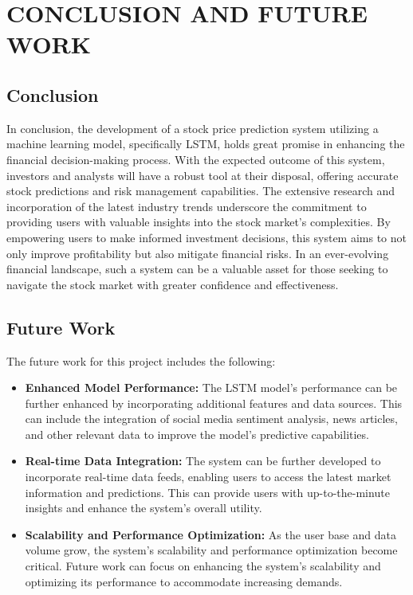 \documentclass[./main.tex]{subfiles}
\begin{document}
\chapter{CONCLUSION AND FUTURE WORK}
\section{Conclusion}
\noindent
In conclusion, the development of a stock price prediction system utilizing a machine learning model, specifically LSTM, holds great promise in enhancing the financial decision-making process. With the expected outcome of this system, investors and analysts will have a robust tool at their disposal, offering accurate stock predictions and risk management capabilities. The extensive research and incorporation of the latest industry trends underscore the commitment to providing users with valuable insights into the stock market's complexities. By empowering users to make informed investment decisions, this system aims to not only improve profitability but also mitigate financial risks. In an ever-evolving financial landscape, such a system can be a valuable asset for those seeking to navigate the stock market with greater confidence and effectiveness.
\section{Future Work}
\noindent
The future work for this project includes the following:
\begin{itemize}
    \item \textbf{Enhanced Model Performance:} The LSTM model's performance can be further enhanced by incorporating additional features and data sources. This can include the integration of social media sentiment analysis, news articles, and other relevant data to improve the model's predictive capabilities.
    \item \textbf{Real-time Data Integration:} The system can be further developed to incorporate real-time data feeds, enabling users to access the latest market information and predictions. This can provide users with up-to-the-minute insights and enhance the system's overall utility.
    \item \textbf{Scalability and Performance Optimization:} As the user base and data volume grow, the system's scalability and performance optimization become critical. Future work can focus on enhancing the system's scalability and optimizing its performance to accommodate increasing demands.
\end{itemize}
\end{document}
